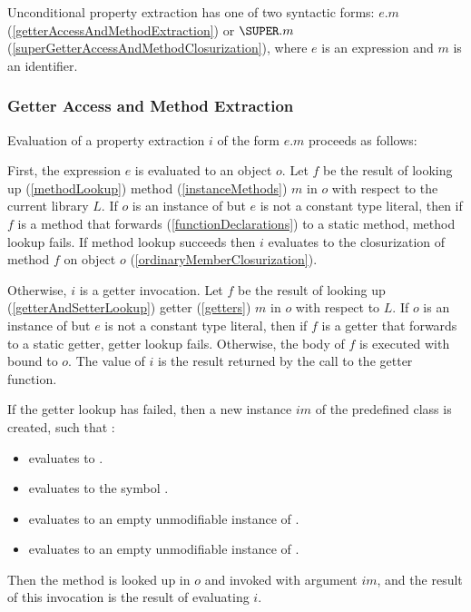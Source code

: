 \documentclass{article}
\begin{document}
\LMHash{}
Unconditional property extraction has one of two syntactic forms: $e.m$ (\ref{getterAccessAndMethodExtraction}) or $\SUPER.m$ (\ref{superGetterAccessAndMethodClosurization}), where $e$ is an expression and $m$ is an identifier.


\subsubsection{Getter Access and Method Extraction}

\LMHash{}
Evaluation of a property extraction $i$ of the form $e.m$ proceeds as follows:

\LMHash{}
First, the expression $e$ is evaluated to an object $o$.
Let $f$ be the result of looking up (\ref{methodLookup}) method (\ref{instanceMethods}) $m$ in $o$ with respect to the current library $L$.
If $o$ is an instance of  but $e$ is not a constant type literal, then if $f$ is a method that forwards (\ref{functionDeclarations}) to a static method, method lookup fails.
If method lookup succeeds then $i$ evaluates to the closurization of method $f$ on object $o$ (\ref{ordinaryMemberClosurization}).


\LMHash{}
Otherwise, $i$ is a getter invocation.
Let $f$ be the result of looking up (\ref{getterAndSetterLookup}) getter (\ref{getters}) $m$ in $o$ with respect to $L$.
If $o$ is an instance of  but $e$ is not a constant type literal, then if $f$ is a getter that forwards to a static getter, getter lookup fails.
Otherwise, the body of $f$ is executed with \THIS{} bound to $o$.
The value of $i$ is the result returned by the call to the getter function.

\LMHash{}
If the getter lookup has failed, then a new instance $im$ of the predefined class  is created, such that :
\begin{itemize}
\item {} evaluates to \code{\TRUE{}}.
\item {} evaluates to the symbol .
\item {} evaluates to an empty unmodifiable instance of .
\item {} evaluates to an empty unmodifiable instance of .
\end{itemize}
Then the method  is looked up in $o$ and invoked with argument $im$, and the result of this invocation is the result of evaluating $i$.
\end{document}
